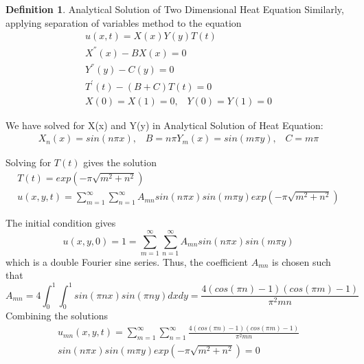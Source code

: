 \documentclass[12pt, oneside]{book}
\theoremstyle{plain}
\theoremstyle{definition}
\newtheorem{definition}[theorem]{Definition}
\begin{document}
\begin{definition}\label{heat2Anal} Analytical Solution of Two Dimensional Heat Equation
Similarly, applying separation of variables method to the equation
\begin{eqnarray}
u(x,t) = X(x) Y(y) T(t) \\[10pt]
X^{''}(x) - B X(x) = 0 \\[10pt]
Y^{''}(y) - C (y) = 0 \\[10pt]
T^{'}(t) - (B + C) T(t) = 0 \\[10pt]
X(0) = X(1) = 0, \hspace{10pt} Y(0) = Y(1) = 0
\end{eqnarray}

We have solved for X(x) and Y(y) in Analytical Solution of Heat Equation:
\begin{eqnarray} 
X_n (x)=  sin(n \pi x), \hspace{10pt} B = n \pi
Y_m (x)=  sin(m \pi y), \hspace{10pt} C = m \pi
\end{eqnarray}

Solving for $T(t)$ gives the solution
\begin{eqnarray}
T(t) = exp(- \pi \sqrt{m^2 + n^2}) \\[10pt]
u(x, y, t) =\sum_{m=1}^{\infty} \sum_{n=1}^{\infty} A_{mn}  sin(n \pi x) sin(m \pi y) exp(- \pi \sqrt{m^2 + n^2})
\end{eqnarray}

The initial condition gives
\begin{equation}
u(x, y, 0) = 1 = \sum_{m=1}^{\infty} \sum_{n=1}^{\infty}  A_{mn} sin(n \pi x) sin(m \pi y)
\end{equation}
which is a double Fourier sine series. Thus, the coefficient $A_{mn}$ is chosen such that
\begin{equation}
 A_{mn} = 4 \int_{0}^{1}  \int_{0}^{1} sin(\pi n x)  sin(\pi n y) dx dy = \frac{4(cos(\pi n) - 1)(cos(\pi m) - 1)}{\pi^2 m n} 
\end{equation}
Combining the solutions
\begin{multline}
u_{mn}(x, y, t) =  \sum_{m=1}^{\infty} \sum_{n=1}^{\infty} \frac{4(cos(\pi n) - 1)(cos(\pi m) - 1)}{\pi^2 m n}  \\ sin(n \pi x) sin(m \pi y) exp(- \pi \sqrt{m^2 + n^2}) = 0
\end{multline}

\end{definition}
\end{document}
